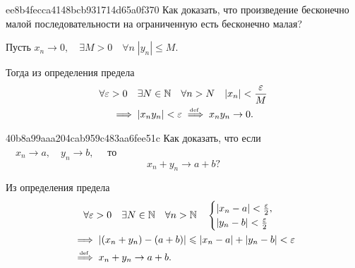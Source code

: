     \begin{note}{ee8b4fecca4148bcb931714d65a0f370}
        Как доказать, что произведение бесконечно малой последовательности на
        ограниченную есть бесконечно малая?

        \begin{cloze}{1}
            Пусть \( x_n \to 0, \quad \exists M > 0 \quad \forall n\; |y_n| \leqslant M. \)

            Тогда из определения предела \begin{multline*}
                \forall \varepsilon > 0 \quad \exists N \in \mathbb N \quad
                \forall n > N \quad |x_n| < \frac{\varepsilon}{M} \\
                \implies |x_n y_n| < \varepsilon \overset{\!\!\text{\tiny def}}\implies  x_n y_n \to 0.
            \end{multline*}
        \end{cloze}
    \end{note}

    \begin{note}{40b8a99aaa204cab959c483aa6fee51c}
        Как доказать, что если \( \quad x_n \to a, \quad y_n \to b, \quad \) то \[
            x_n + y_n \to a + b?
        \]

        \begin{cloze}{1}
            Из определения предела \[
                \begin{gathered}
                    \forall \varepsilon > 0 \quad \exists N \in \mathbb N \quad \forall n > \mathbb N \quad \begin{cases}
                        |x_n - a| < \frac{\varepsilon}{2}, \\
                        |y_n - b| < \frac{\varepsilon}{2}
                    \end{cases} \\
                    \begin{aligned}
                        &\implies |(x_n + y_n) - (a + b)| \leqslant |x_n - a| + |y_n - b| < \varepsilon \\
                        &\overset{\!\!\text{\tiny def}}\implies x_n + y_n \to a + b.
                    \end{aligned}
                \end{gathered}
            \]
        \end{cloze}
    \end{note}

